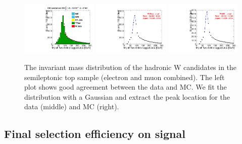 \begin{figure}[htb] 
  {\centering
    \includegraphics[width=0.325\textwidth]{plots/2012_JES/top_overlap_muel.pdf}
    \includegraphics[width=0.325\textwidth]{plots/2012_JES/top_data_fit_muel.pdf}
    \includegraphics[width=0.325\textwidth]{plots/2012_JES/top_mc_fit_muel.pdf}
    \caption{The invariant mass distribution of the hadronic 
      W candidates in the semileptonic top sample (electron and 
      muon combined). 
      The left plot shows good agreement between the data and MC. 
      We fit the distribution with a Gaussian and extract the peak
      location for the data (middle) and MC (right).}
    \label{fig:topw:muel}}
\end{figure}


\subsection{Final selection efficiency on signal}
\label{sec:mvaseleffunc}

